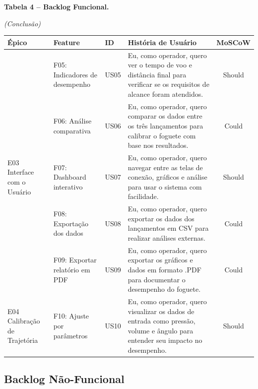 \begin{table}[H] 
    \centerline{\textbf{Tabela 4 – Backlog Funcional.}}
    \hfill\textit{(Conclusão)}
    
    \vspace{0.1cm} %
    \centering
    \begin{tabular}{|p{2.5cm}|p{3.5cm}|l|p{5.5cm}|c|}
    \hline
    \textbf{Épico} & \textbf{Feature} & \textbf{ID} & \textbf{História de Usuário} & \textbf{MoSCoW} \\
    \hline
    & F05: Indicadores de desempenho & US05 & Eu, como operador, quero ver o tempo de voo e distância final para verificar se os requisitos de alcance foram atendidos. & Should \\
    \cline{2-5}
    & F06: Análise comparativa & US06 & Eu, como operador, quero comparar os dados entre os três lançamentos para calibrar o foguete com base nos resultados. & Could \\
    \hline
    E03 Interface com o Usuário & F07: Dashboard interativo & US07 & Eu, como operador, quero navegar entre as telas de conexão, gráficos e análise para usar o sistema com facilidade. & Should \\
    \cline{2-5}
    & F08: Exportação dos dados & US08 & Eu, como operador, quero exportar os dados dos lançamentos em CSV para realizar análises externas. & Could \\
    \cline{2-5}
    & F09: Exportar relatório em PDF & US09 & Eu, como operador, quero exportar os gráficos e dados em formato .PDF para documentar o desempenho do foguete. & Could \\
    \hline
    E04 Calibração de Trajetória & F10: Ajuste por parâmetros & US10 & Eu, como operador, quero visualizar os dados de entrada como pressão, volume e ângulo para entender seu impacto no desempenho. & Should \\
    \hline
    \end{tabular}
\end{table}





\renewcommand{\arraystretch}{1.2} %

\subsection{Backlog Não-Funcional}

